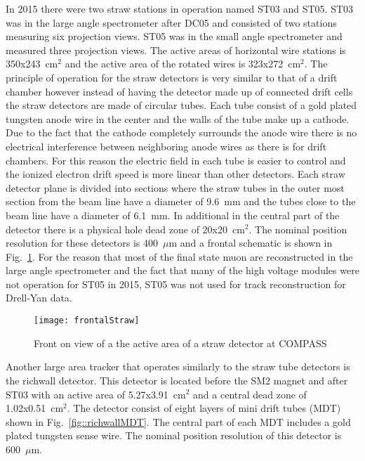 In 2015 there were two straw stations in operation named ST03 and ST05.  ST03
was in the large angle spectrometer after DC05 and consisted of two stations
measuring six projection views.  ST05 was in the small angle spectrometer and
measured three projection views.  The active areas of horizontal wire stations
is 350x243~cm$^2$ and the active area of the rotated wires is 323x272~cm$^2$.
The principle of operation for the straw detectors is very similar to that of a
drift chamber however instead of having the detector made up of connected drift
cells the straw detectors are made of circular tubes.  Each tube consist of a
gold plated tungsten anode wire in the center and the walls of the tube make up
a cathode.  Due to the fact that the cathode completely surrounds the anode wire
there is no electrical interference between neighboring anode wires as there is
for drift chambers.  For this reason the electric field in each tube is easier
to control and the ionized electron drift speed is more linear than other
detectors.  Each straw detector plane is divided into sections where the straw
tubes in the outer most section from the beam line have a diameter of 9.6~mm and
the tubes close to the beam line have a diameter of 6.1~mm.  In additional in
the central part of the detector there is a physical hole dead zone of
20x20~cm$^2$.  The nominal position resolution for these detectors is 400~$\mu$m
and a frontal schematic is shown in Fig.~\ref{fig::frontalStraw}.  For the
reason that most of the final state muon are reconstructed in the large angle
spectrometer and the fact that many of the high voltage modules were not
operation for ST05 in 2015, ST05 was not used for track reconstruction for
Drell-Yan data. \par

\begin{figure}[h!t]
  \centering
  \texttt{[image: frontalStraw]}
  \caption{Front on view of a the active area of a straw detector at COMPASS}
  \label{fig::frontalStraw}
\end{figure}

Another large area tracker that operates similarly to the straw tube detectors
is the richwall detector.  This detector is located before the SM2 magnet and
after ST03 with an active area of 5.27x3.91~cm$^2$ and a central dead zone of
1.02x0.51~cm$^2$.  The detector consist of eight layers of mini drift tubes
(MDT) shown in Fig.~\ref{fig::richwallMDT}.  The central part of each MDT
includes a gold plated tungsten sense wire.  The nominal position resolution of
this detector is 600~$\mu$m. \par

